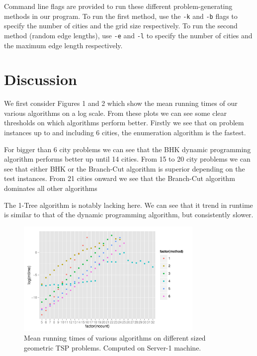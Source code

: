 \documentclass[11pt]{article}
\begin{document}
Command line flags are provided to run these different problem-generating methods in our program. To run the first method, use the \texttt{-k} and \texttt{-b} flags to specify the number of cities and the grid size respectively. To run the second method (random edge lengths), use \texttt{-e} and \texttt{-l} to specify the number of cities and the maximum edge length respectively.

\section{Discussion}
\label{sec:discussion}
We first consider Figures 1 and 2 which show the mean running times of our various algorithms on a log scale. From these plots we can see some clear thresholds on which algorithms perform better. Firstly we see that on problem instances up to and including 6 cities, the enumeration algorithm is the fastest.

For bigger than 6 city problems we can see that the BHK dynamic programming algorithm performs better up until 14 cities. From 15 to 20 city problems we can see that either BHK or the Branch-Cut algorithm is superior depending on the test instances. From 21 cities onward we see that the Branch-Cut algorithm dominates all other algorithms

The 1-Tree algorithm is notably lacking here. We can see that it trend in runtime is similar to that of the dynamic programming algorithm, but consistently slower.

\begin{figure}[H]
\center
\includegraphics[width=0.8\textwidth]{s1-log}
\caption{Mean running times of various algorithms on different sized geometric TSP problems. Computed on Server-1 machine.}
\end{figure}
\end{document}
